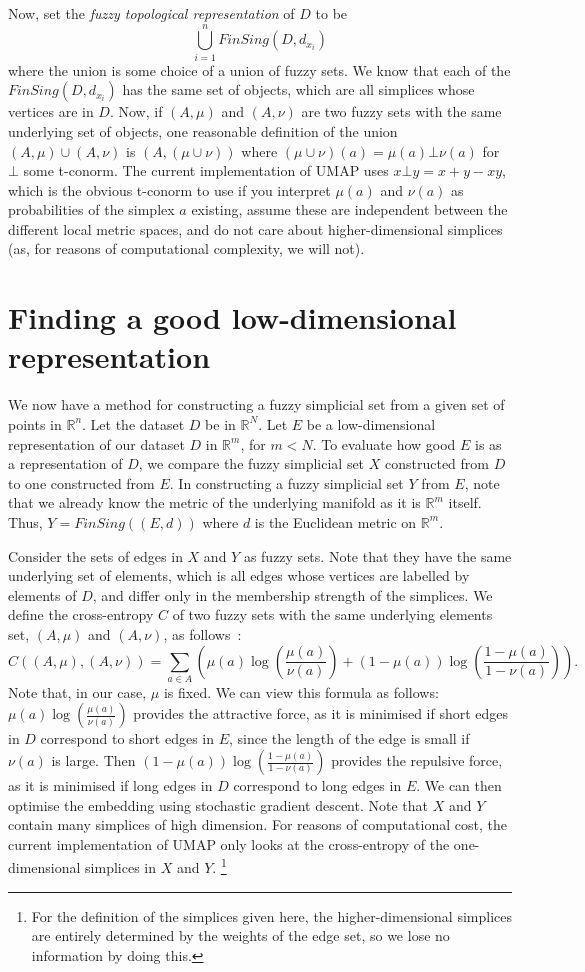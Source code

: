 \documentclass[a4paper,11pt,leqno]{article} \usepackage{amsmath}
\newcommand{\RR}{\mathbb{R}} \newcommand{\QQ}{\mathbb{Q}}
\theoremstyle{definition}
\begin{document}
Now, set the \emph{fuzzy topological representation} of $D$ to be
$$\bigcup_{i=1}^n FinSing(D, d_{x_i})$$ where the union is some choice of
a union of fuzzy sets.
We know that each of the $FinSing(D, d_{x_i})$ has the same set of objects,
which are all simplices whose vertices are in $D$.
Now, if $(A, \mu)$ and $(A, \nu)$ are two fuzzy sets with the same underlying
set of objects, one reasonable definition of the union $(A, \mu) \cup (A, \nu)$
is $(A, (\mu\cup\nu))$ where $(\mu\cup\nu)(a) = \mu(a) \bot \nu(a)$ for $\bot$
some t-conorm.
The current implementation of UMAP uses $x\bot y = x+y-xy$, which is the
obvious t-conorm to use if you interpret $\mu(a)$ and $\nu(a)$ as probabilities
of the simplex $a$ existing, assume these are independent between the different
local metric spaces, and do not care about higher-dimensional simplices (as,
for reasons of computational complexity, we will not).

\section{Finding a good low-dimensional representation}

We now have a method for constructing a fuzzy simplicial set from a given set of
points in $\RR^n$.
Let the dataset $D$ be in $\RR^N$.
Let $E$ be a low-dimensional representation of our dataset $D$ in $\RR^m$, for
$m < N$.
To evaluate how good $E$ is as a representation of $D$, we compare the fuzzy
simplicial set $X$ constructed from $D$ to one constructed from $E$.
In constructing a fuzzy simplicial set $Y$ from $E$, note that we already know
the metric of the underlying manifold as it is $\RR^m$ itself.
Thus, $Y = FinSing((E, d))$ where $d$ is the Euclidean metric on $\RR^m$.

Consider the sets of edges in $X$ and $Y$ as fuzzy sets.
Note that they have the same underlying set of elements, which is all edges
whose vertices are labelled by elements of $D$, and differ only in the
membership strength of the simplices.
We define the cross-entropy $C$ of two fuzzy sets with the same underlying
elements set, $(A, \mu)$ and $(A, \nu)$, as follows~\cite[Definition
10]{McInnes18}:
$$C((A, \mu), (A, \nu)) = \sum_{a\in A} \left( \mu(a) \log\left(
\frac{\mu(a)}{\nu(a)}\right) + (1-\mu(a))\log\left(\frac{1-\mu(a)}{1-\nu(a)}
\right)\right).$$
Note that, in our case, $\mu$ is fixed.
We can view this formula as follows:
$\mu(a)\log\left(\frac{\mu(a)}{\nu(a)}\right)$ provides the attractive force, as
it is minimised if short edges in $D$ correspond to short edges in $E$, since
the length of the edge is small if $\nu(a)$ is large.
Then $(1-\mu(a))\log\left(\frac{1-\mu(a)}{1-\nu(a)}\right)$ provides the
repulsive force, as it is minimised if long edges in $D$ correspond to long
edges in $E$.
We can then optimise the embedding using stochastic gradient descent.
Note that $X$ and $Y$ contain many simplices of high dimension.
For reasons of computational cost, the current implementation of UMAP only looks
at the cross-entropy of the one-dimensional simplices in $X$ and $Y$.
\footnote{
	For the definition of the simplices given here, the higher-dimensional
	simplices are entirely determined by the weights of the edge set, so we lose
	no information by doing this.
}
\end{document}
